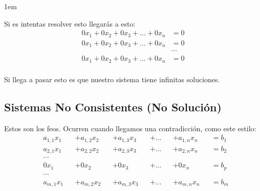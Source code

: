 \documentclass[12pt, fleqn]{report}                             %
\newenvironment{SmallIndentation}[1][0.75em]                    %
    {\begin{adjustwidth}{#1}{}\begin{footnotesize}}                 %
    {\end{footnotesize}\end{adjustwidth}}                           %
\begin{document}
\begin{itemize}
\begin{SmallIndentation}[1em]
                            Si es intentas resolver esto llegarás a esto:
                            \begin{equation*}
                            \begin{split}
                                0x_1   + 0x_2 + 0x_3 + \dots + 0x_n &= 0    \\
                                0x_1   + 0x_2 + 0x_3 + \dots + 0x_n &= 0    \\
                                &\cdots                                     \\
                                0x_1   + 0x_2 + 0x_3 + \dots + 0x_n &= 0    \\
                            \end{split}
                            \end{equation*}

                            Si llega a pasar esto es que nuestro sistema tiene infinitas soluciones.

                        \end{SmallIndentation}

                \end{itemize}



            \clearpage
            \subsection{Sistemas No Consistentes (No Solución)}

                Estos son los feos.
                Ocurren cuando llegamos una contradicción, como este estilo:
                \begin{equation}
                \begin{split}
                    & a_{1,1}x_1 &&+ a_{1,2}x_2 &&+ a_{1,3}x_3 &&+ \dots &&+ a_{1,n}x_n &&= b_1 \\
                    & a_{2,1}x_1 &&+ a_{2,2}x_2 &&+ a_{2,3}x_3 &&+ \dots &&+ a_{2,n}x_n &&= b_2 \\
                    &\cdots                                                                     \\
                    & 0x_1       &&+ 0x_2       &&+ 0x_3       &&+ \dots &&+ 0x_n       &&= b_p \\
                    &\cdots                                                                     \\
                    & a_{m,1}x_1 &&+ a_{m,2}x_2 &&+ a_{m,3}x_3 &&+ \dots &&+ a_{m,n}x_n &&= b_m \\
                \end{split}
                \end{equation}
\end{document}
